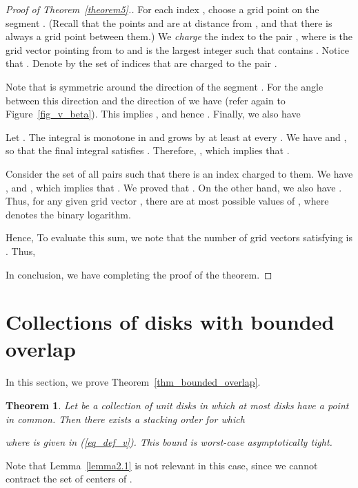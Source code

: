 \documentclass[11pt]{article}
\newtheorem{thm}{Theorem}             \newtheorem{lem}[thm]{Lemma}
\begin{document}
\begin{proof}[Proof of Theorem~\ref{theorem5}.]
For each index , choose a grid point  on the segment . (Recall that the points  and  are at distance  from , and that there is always a grid point between them.) We {\em charge} the index  to the pair , where  is the grid vector pointing from  to  and  is the largest integer such that  contains . Notice that . Denote by  the set of indices  that are charged to the pair .

Note that  is symmetric around the direction of the segment
. For the angle  between this direction and the
direction of  we have
 (refer again to Figure~\ref{fig_v_beta}). This implies
, and hence
. Finally, we also have


Let . The integral 
is monotone in  and grows by at least  at every
. We have  and
, so that the final integral satisfies
. Therefore, , which implies that .

Consider the set of all pairs  such that there is an index  charged to them. We have ,  and , which implies that . We proved that .
On the other hand, we also have . Thus,
for any given grid vector , there are at most 
possible values of , where  denotes the binary logarithm.

Hence, 
To evaluate this sum, we note that the number of grid vectors  satisfying  is . Thus,

In conclusion, we have 
completing the proof of the theorem.
\end{proof}

\section{Collections of disks with bounded overlap}

In this section, we prove Theorem~\ref{thm_bounded_overlap}.

{
\renewcommand{\thethm}{6}
\begin{thm}
Let  be a collection of  unit disks in which at most  disks have a point in common. Then there exists a stacking order  for which

where  is given in (\ref{eq_def_v}). This bound is worst-case asymptotically tight.
\end{thm}
\addtocounter{thm}{-1}
}

Note that Lemma~\ref{lemma2.1} is not relevant in this case, since we cannot contract the set of centers of .
\end{document}
